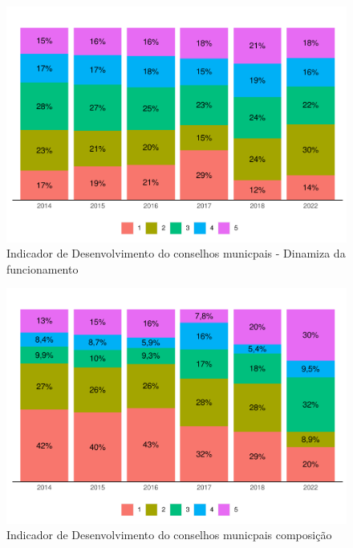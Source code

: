 \documentclass[
  brazilian]{report}
\begin{document}
\begin{figure}
\includegraphics{Censo-SUAS-2022_files/figure-latex/id_fun-1} \caption[Indicador de Desenvolvimento do conselhos municpais - Dinamiza da funcionamento]{Indicador de Desenvolvimento do conselhos municpais - Dinamiza da funcionamento}\label{fig:id_fun}
\end{figure}

\begin{figure}
\includegraphics{Censo-SUAS-2022_files/figure-latex/idcom-1} \caption[Indicador de Desenvolvimento do conselhos municpais composição]{Indicador de Desenvolvimento do conselhos municpais composição}\label{fig:idcom}
\end{figure}
\end{document}
